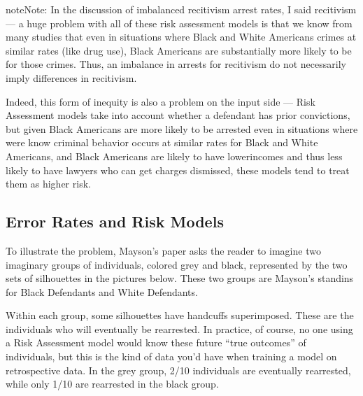 \documentclass[letterpaper,10pt,english]{jupyterBook}
\begin{document}
\begin{sphinxadmonition}{note}{Note:}
\sphinxAtStartPar
In the discussion of imbalanced recitivism arrest rates, I said  recitivism — a huge problem with all of these risk assessment models is that we know from many studies that even in situations where Black and White Americans  crimes at similar rates (like drug use), Black Americans are substantially more likely to be  for those crimes. Thus, an imbalance in arrests for recitivism do not necessarily imply differences in  recitivism.

\sphinxAtStartPar
Indeed, this form of inequity is also a problem on the input side — Risk Assessment models take into account whether a defendant has prior convictions, but given Black Americans are more likely to be arrested even in situations where were know criminal behavior occurs at similar rates for Black and White Americans, and Black Americans are likely to have lower\sphinxhyphen{}incomes and thus less likely to have lawyers who can get charges dismissed, these models tend to treat them as higher risk.
\end{sphinxadmonition}


\subsection{Error Rates and Risk Models}
\label{\detokenize{30_questions/25_passive_fairness:error-rates-and-risk-models}}
\sphinxAtStartPar
To illustrate the problem, Mayson’s paper asks the reader to imagine two imaginary groups of individuals, colored grey and black, represented by the two sets of silhouettes in the pictures below. These two groups are Mayson’s stand\sphinxhyphen{}ins for Black Defendants and White Defendants.

\sphinxAtStartPar
{}

\sphinxAtStartPar
Within each group, some silhouettes have handcuffs super\sphinxhyphen{}imposed. These are the individuals who will eventually be re\sphinxhyphen{}arrested. In practice, of course, no one using a Risk Assessment model would know these future “true outcomes” of individuals, but this is the kind of data you’d have when training a model on retrospective data. In the grey group, 2/10 individuals are eventually re\sphinxhyphen{}arrested, while only 1/10 are re\sphinxhyphen{}arrested in the black group.
\end{document}
